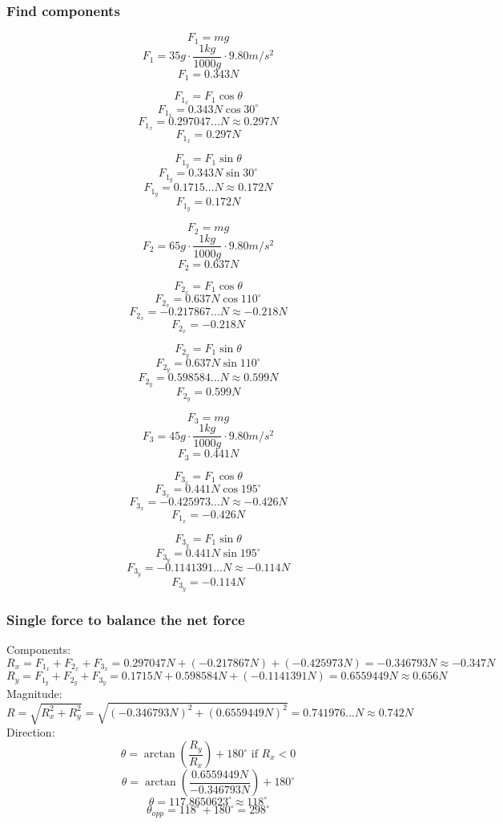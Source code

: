\documentclass[11pt, letterpaper, includehead]{article}
\begin{document}
\subsubsection{Find components} %
\begin{multicols}{3}
  $$F_1 = mg$$
  $$F_1 = 35g \cdot \frac{1kg}{1000g} \cdot 9.80m/s^2$$
  $$F_1 = 0.343N$$

  $$F_{1_x} = F_1\cos\theta$$
  $$F_{1_x} = 0.343N\cos30^{\circ}$$
  $$F_{1_x} = 0.297047...N \approx 0.297N$$
  $$\boxed{F_{1_x} = 0.297N}$$

  $$F_{1_y} = F_1\sin\theta$$
  $$F_{1_y} = 0.343N\sin30^{\circ}$$
  $$F_{1_y} = 0.1715...N \approx 0.172N$$
  $$\boxed{F_{1_y} = 0.172N}$$

  \columnbreak
  $$F_2 = mg$$
  $$F_2 = 65g \cdot \frac{1kg}{1000g} \cdot 9.80m/s^2$$
  $$F_2 = 0.637N$$

  $$F_{2_x} = F_1\cos\theta$$
  $$F_{2_x} = 0.637N\cos110^{\circ}$$
  $$F_{2_x} = -0.217867...N \approx -0.218N$$
  $$\boxed{F_{2_x} = -0.218N}$$

  $$F_{2_y} = F_1\sin\theta$$
  $$F_{2_y} = 0.637N\sin110^{\circ}$$
  $$F_{2_y} = 0.598584...N \approx 0.599N$$
  $$\boxed{F_{2_y} = 0.599N}$$

  \columnbreak
  $$F_3 = mg$$
  $$F_3 = 45g \cdot \frac{1kg}{1000g} \cdot 9.80m/s^2$$
  $$F_3 = 0.441N$$

  $$F_{3_x} = F_1\cos\theta$$
  $$F_{3_x} = 0.441N\cos195^{\circ}$$
  $$F_{3_x} = -0.425973...N \approx -0.426N$$
  $$\boxed{F_{1_x} = -0.426N}$$

  $$F_{3_y} = F_1\sin\theta$$
  $$F_{3_y} = 0.441N\sin195^{\circ}$$
  $$F_{3_y} = -0.1141391...N \approx -0.114N$$
  $$\boxed{F_{3_y} = -0.114N}$$
 
\end{multicols}

\subsubsection{Single force to balance the net force} %
Components:
$$R_x = F_{1_x} + F_{2_x} + F_{3_x} = 0.297047N + (-0.217867N) + (-0.425973N) = -0.346793N \approx \boxed{-0.347N} $$
$$R_y = F_{1_y} + F_{2_y} + F_{3_y} = 0.1715N + 0.598584N + (-0.1141391N) = 0.6559449N \approx \boxed{0.656N} $$
Magnitude:
$$R = \sqrt{R_x^2 + R_y^2} = \sqrt{(-0.346793N)^2 + (0.6559449N)^2} = 0.741976...N \approx \boxed{0.742N}$$
Direction:
$$\theta = \arctan \left( \frac{R_y}{R_x} \right) + 180^{\circ} \text{ if } R_x < 0$$
$$\theta = \arctan \left( \frac{0.6559449N}{-0.346793N} \right) + 180^{\circ}$$
$$\theta = 117.8650623^{\circ} \approx {118^{\circ}}$$
$$\theta_{opp} = 118^{\circ} + 180^{\circ} = \boxed{298^{\circ}}$$
\end{document}
